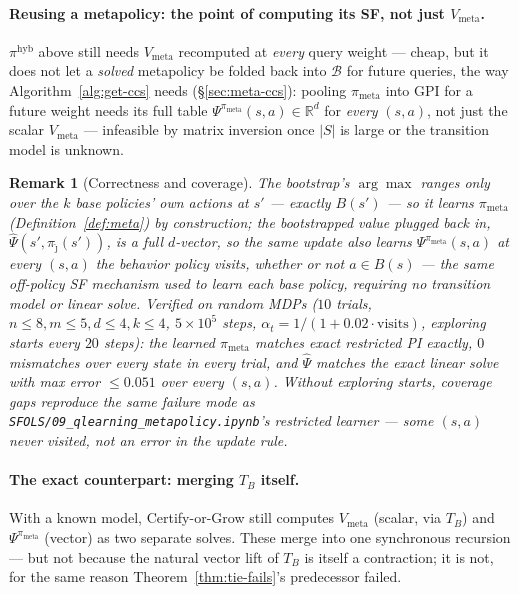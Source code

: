 \documentclass[11pt]{article}
\newtheorem{remark}{Remark}
\begin{document}
\paragraph{Reusing a metapolicy: the point of computing its SF, not just $V_{\mathrm{meta}}$.} $\pi^{\mathrm{hyb}}$
above still needs $V_{\mathrm{meta}}$ recomputed at \emph{every} query weight — cheap, but it does not let a
\emph{solved} metapolicy be folded back into $\mathcal B$ for future queries, the way
Algorithm~\ref{alg:get-ccs} needs (\S\ref{sec:meta-ccs}): pooling $\pi_{\mathrm{meta}}$ into GPI for a future weight needs its
full table $\Psi^{\pi_{\mathrm{meta}}}(s,a)\in\mathbb R^d$ for \emph{every} $(s,a)$, not just the scalar
$V_{\mathrm{meta}}$ — infeasible by matrix inversion once $|S|$ is large or the transition model is unknown.

\begin{remark}[Correctness and coverage]
The bootstrap's $\arg\max$ ranges only over the $k$ base policies' own actions at $s'$ — exactly $B(s')$ — so it
learns $\pi_{\mathrm{meta}}$ (Definition~\ref{def:meta}) by construction; the bootstrapped \emph{value} plugged back
in, $\widehat\Psi(s',\pi_{\hat\jmath}(s'))$, is a full $d$-vector, so the same update also learns
$\Psi^{\pi_{\mathrm{meta}}}(s,a)$ at every $(s,a)$ the behavior policy visits, whether or not $a\in B(s)$ — the same
off-policy SF mechanism used to learn each base policy, requiring no transition model or linear solve. Verified on
random MDPs ($10$ trials, $n{\le}8,m{\le}5,d{\le}4,k{\le}4$, $5{\times}10^5$ steps,
$\alpha_t=1/(1{+}0.02\cdot\mathrm{visits})$, exploring starts every $20$ steps): the learned $\pi_{\mathrm{meta}}$
matches exact restricted PI exactly, $0$ mismatches over every state in every trial, and $\widehat\Psi$ matches the
exact linear solve with max error $\le0.051$ over every $(s,a)$. Without exploring starts, coverage gaps reproduce
the same failure mode as \texttt{SFOLS/09\_qlearning\_metapolicy.ipynb}'s restricted learner — some $(s,a)$ never
visited, not an error in the update rule.
\end{remark}

\paragraph{The exact counterpart: merging $T_B$ itself.} With a known model, Certify-or-Grow still computes
$V_{\mathrm{meta}}$ (scalar, via $T_B$) and $\Psi^{\pi_{\mathrm{meta}}}$ (vector) as two separate solves. These merge
into one synchronous recursion — but not because the natural vector lift of $T_B$ is itself a contraction; it is
not, for the same reason Theorem~\ref{thm:tie-fails}'s predecessor failed.
\end{document}
